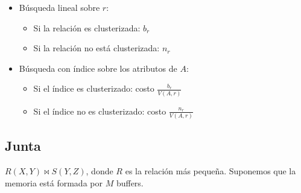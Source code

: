 \documentclass[a4paper, twoside]{article}
\begin{document}
\begin{itemize}
	\item Búsqueda lineal sobre $r$:
	\begin{itemize}
		\item Si la relación es clusterizada: $b_{r}$
		\item Si la relación no está clusterizada: $n_{r}$
	\end{itemize}
	\item Búsqueda con índice sobre los atributos de $A$:
	\begin{itemize}
		\item Si el índice es clusterizado: costo $\frac{b_{r}}{V(A,r)}$
		\item Si el índice no es clusterizado: costo $\frac{n_{r}}{V(A,r)}$
	\end{itemize}
\end{itemize}

\subsection{Junta}
$R(X,Y)\bowtie S(Y,Z)$, donde $R$ es la relación más pequeña. Suponemos que la memoria está formada por $M$ buffers.
\end{document}

